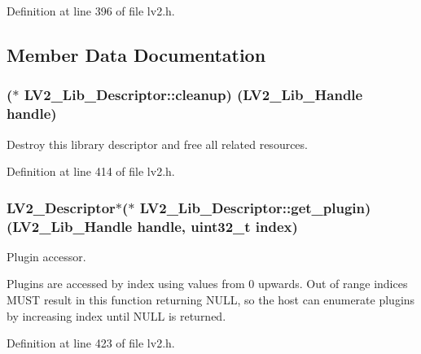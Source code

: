 Definition at line 396 of file lv2.\+h.



\subsection{Member Data Documentation}
\subsubsection[{\texorpdfstring{cleanup}{cleanup}}]{($\ast$ L\+V2\+\_\+\+Lib\+\_\+\+Descriptor\+::cleanup) ({\bf L\+V2\+\_\+\+Lib\+\_\+\+Handle} {\bf handle})}\hypertarget{struct_l_v2___lib___descriptor_af74270275ff1c5931ef2ab8a57f77065}{}\label{struct_l_v2___lib___descriptor_af74270275ff1c5931ef2ab8a57f77065}
Destroy this library descriptor and free all related resources. 

Definition at line 414 of file lv2.\+h.

\subsubsection[{\texorpdfstring{get\+\_\+plugin}{get_plugin}}]{ {\bf L\+V2\+\_\+\+Descriptor}$\ast$($\ast$ L\+V2\+\_\+\+Lib\+\_\+\+Descriptor\+::get\+\_\+plugin) ({\bf L\+V2\+\_\+\+Lib\+\_\+\+Handle} {\bf handle}, {\bf uint32\+\_\+t} index)}\hypertarget{struct_l_v2___lib___descriptor_a6c29de06901b337df58d9e95b94c95fb}{}\label{struct_l_v2___lib___descriptor_a6c29de06901b337df58d9e95b94c95fb}
Plugin accessor.

Plugins are accessed by index using values from 0 upwards. Out of range indices M\+U\+ST result in this function returning N\+U\+LL, so the host can enumerate plugins by increasing {\ttfamily index} until N\+U\+LL is returned. 

Definition at line 423 of file lv2.\+h.

